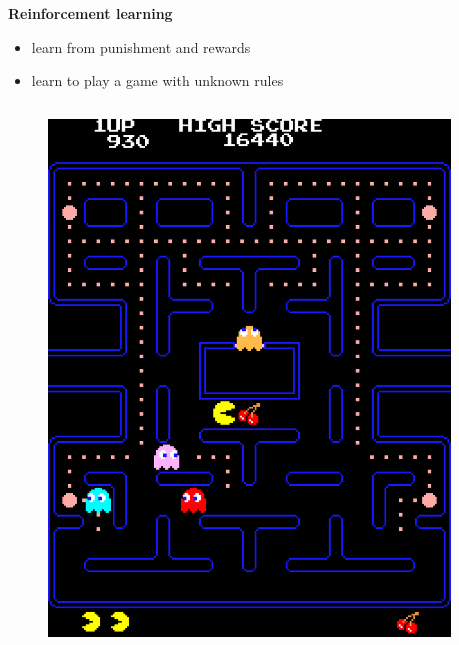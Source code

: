 \documentclass[xcolor=dvipsnames]{beamer}
\begin{document}
\begin{frame}{\bf Reinforcement learning}

\begin{itemize}
  \item learn from punishment and rewards
  \item learn to play a game with unknown rules
\end{itemize}

\begin{columns}
\begin{column}{0.5\textwidth}

  \begin{figure}
    \includegraphics[scale=0.5]{../../pictures/pacman.jpg}
  \end{figure}

\end{column}
\begin{column}{0.5\textwidth}  %


\end{column}
\end{columns}
\end{frame}
\end{document}
